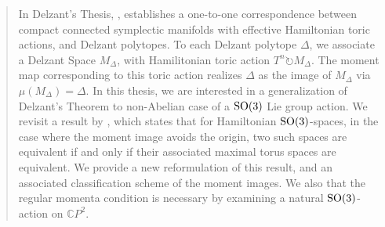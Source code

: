\begin{abstract}
In Delzant's Thesis, \textcite{Delzant1988}, establishes a one-to-one correspondence between compact connected symplectic manifolds with effective Hamiltonian toric actions, and Delzant polytopes. To each Delzant polytope $\Delta$, we associate a Delzant Space $M_{\Delta}$, with Hamilitonian toric action $T^{n} \circlearrowright M_{\Delta}$. The moment map corresponding to this toric action realizes $\Delta$ as the image of $M_{\Delta}$ via $\mu(M_{\Delta}) = \Delta$. In this thesis, we are interested in a generalization of Delzant's Theorem to non-Abelian case of a $\rm{SO}(3)$ Lie group action. We revisit a result by \textcite{Blaom1996}, which states that for Hamiltonian $\rm{SO}(3)$-spaces, in the case where the moment image avoids the origin, two such spaces are equivalent if and only if their associated maximal torus spaces are equivalent. We provide a new reformulation of this result, and an associated classification scheme of the moment images. We also that the regular momenta condition is necessary by examining a natural $\rm{SO}(3)$-action on $\mathbb{C}P^2$.
\end{abstract}